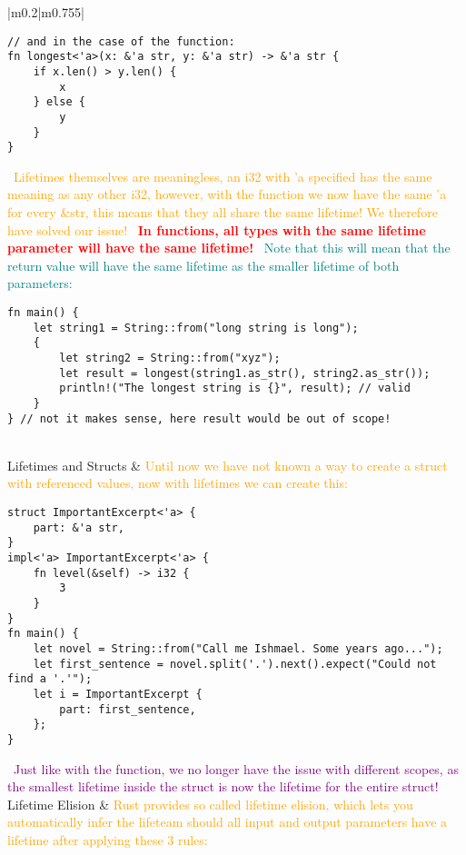 \documentclass[main.tex,fontsize=8pt,paper=a4,paper=portrait,DIV=calc,]{scrartcl}
\begin{document}
\begin{table}[ht!]
\begin{tabular}{|m{0.2\linewidth}|m{0.755\linewidth}|}
\begin{lstlisting}
// and in the case of the function:
fn longest<'a>(x: &'a str, y: &'a str) -> &'a str {
    if x.len() > y.len() {
        x
    } else {
        y
    }
}
\end{lstlisting}
\, \newline
\textcolor{orange}{Lifetimes themselves are meaningless, an i32 with 'a specified has the same meaning as any other i32, however, with the function we now have the same 'a for every \&str, this means that they all share the same lifetime! We therefore have solved our issue!}\newline
\, \newline 
\textcolor{red}{\textbf{In functions, all types with the same lifetime parameter will have the same lifetime!}}\newline
\, \newline
\textcolor{teal}{Note that this will mean that the return value will have the same lifetime as the smaller lifetime of both parameters:}\newline
\begin{lstlisting}
fn main() {
    let string1 = String::from("long string is long");
    {
        let string2 = String::from("xyz");
        let result = longest(string1.as_str(), string2.as_str());
        println!("The longest string is {}", result); // valid
    }
} // not it makes sense, here result would be out of scope!
\end{lstlisting}\\
\hline
Lifetimes and Structs &
\textcolor{orange}{Until now we have not known a way to create a struct with referenced values, now with lifetimes we can create this:}\newline
\begin{lstlisting}
struct ImportantExcerpt<'a> {
    part: &'a str,
}
impl<'a> ImportantExcerpt<'a> {
    fn level(&self) -> i32 {
        3
    }
}
fn main() {
    let novel = String::from("Call me Ishmael. Some years ago...");
    let first_sentence = novel.split('.').next().expect("Could not find a '.'");
    let i = ImportantExcerpt {
        part: first_sentence,
    };
}
\end{lstlisting}
\, \newline
\textcolor{purple}{Just like with the function, we no longer have the issue with different scopes, as the smallest lifetime inside the struct is now the lifetime for the entire struct!}\\
\hline
Lifetime Elision & 
\textcolor{orange}{Rust provides so called lifetime elision, which lets you automatically infer the lifeteam should all input and output parameters have a lifetime after applying these 3 rules:}\newline

\end{tabular}
\end{table}
\end{document}
